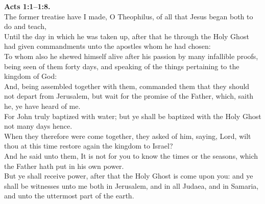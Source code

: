 \documentclass[10pt]{article} %
\begin{document}
{\begin{minipage}[t]{0.45\textwidth}
\textbf{Acts 1:1--1:8.}\\
The former treatise have I made, O Theophilus, of all that Jesus began both to do and teach,\\
Until the day in which he was taken up, after that he through the Holy Ghost had given commandments unto the apostles whom he had chosen:\\
To whom also he shewed himself alive after his passion by many infallible proofs, being seen of them forty days, and speaking of the things pertaining to the kingdom of God:\\
And, being assembled together with them, commanded them that they should not depart from Jerusalem, but wait for the promise of the Father, which, saith he, ye have heard of me.\\
For John truly baptized with water; but ye shall be baptized with the Holy Ghost not many days hence.\\
When they therefore were come together, they asked of him, saying, Lord, wilt thou at this time restore again the kingdom to Israel?\\
And he said unto them, It is not for you to know the times or the seasons, which the Father hath put in his own power.\\
But ye shall receive power, after that the Holy Ghost is come upon you: and ye shall be witnesses unto me both in Jerusalem, and in all Judaea, and in Samaria, and unto the uttermost part of the earth.\\

\end{minipage}}
\vspace*{\fill}
\newpage
\Huge%
\vspace*{\fill}
\begin{spacing}{1.3}%
\end{spacing}
\vspace*{\fill}
\end{document}
